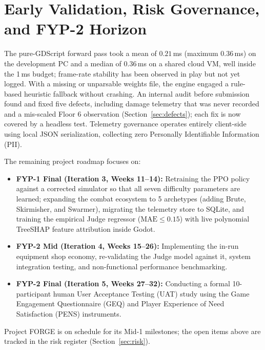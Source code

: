 \section*{Early Validation, Risk Governance, and FYP-2 Horizon}
The pure-GDScript forward pass took a mean of $0.21$\,ms (maximum $0.36$\,ms) on the development PC and a median of $0.36$\,ms on a shared cloud VM, well inside the 1\,ms budget; frame-rate stability has been observed in play but not yet logged. With a missing or unparsable weights file, the engine engaged a rule-based heuristic fallback without crashing. An internal audit before submission found and fixed five defects, including damage telemetry that was never recorded and a mis-scaled Floor 6 observation (Section~\ref{sec:defects}); each fix is now covered by a headless test. Telemetry governance operates entirely client-side using local JSON serialization, collecting zero Personally Identifiable Information (PII).

The remaining project roadmap focuses on:
\begin{itemize}
    \item \textbf{FYP-1 Final (Iteration 3, Weeks 11--14):} Retraining the PPO policy against a corrected simulator so that all seven difficulty parameters are learned; expanding the combat ecosystem to 5 archetypes (adding Brute, Skirmisher, and Swarmer), migrating the telemetry store to SQLite, and training the empirical Judge regressor ($\text{MAE} \le 0.15$) with live polynomial TreeSHAP feature attribution inside Godot.
    \item \textbf{FYP-2 Mid (Iteration 4, Weeks 15--26):} Implementing the in-run equipment shop economy, re-validating the Judge model against it, system integration testing, and non-functional performance benchmarking.
    \item \textbf{FYP-2 Final (Iteration 5, Weeks 27--32):} Conducting a formal 10-participant human User Acceptance Testing (UAT) study using the Game Engagement Questionnaire (GEQ) and Player Experience of Need Satisfaction (PENS) instruments.
\end{itemize}
Project FORGE is on schedule for its Mid-1 milestones; the open items above are tracked in the risk register (Section~\ref{sec:risk}).
